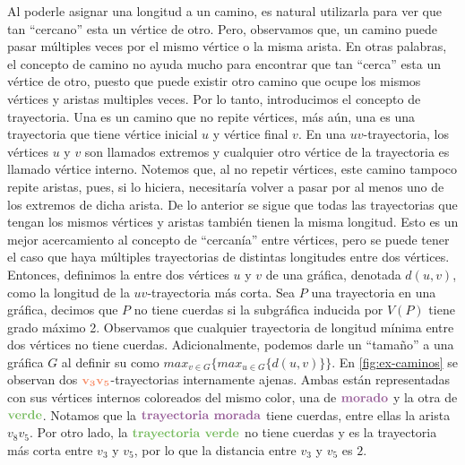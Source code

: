     Al poderle asignar una longitud a un camino, es natural utilizarla para ver
    que tan ``cercano'' esta un v\'ertice de otro. Pero, observamos que, un
    camino puede pasar m\'ultiples veces por el mismo v\'ertice o la misma
    arista. En otras palabras, el concepto de camino no ayuda mucho para
    encontrar que tan ``cerca'' esta un v\'ertice de otro, puesto que puede
    existir otro camino que ocupe los mismos v\'ertices y aristas multiples
    veces. Por lo tanto, introducimos el concepto de trayectoria. Una
     es un camino que no repite v\'ertices, m\'as a\'un, una
     es una trayectoria que tiene v\'ertice inicial $u$
    y v\'ertice final $v$. En una $uv$-trayectoria, los v\'ertices $u$ y $v$ son
    llamados extremos y cualquier otro v\'ertice de la trayectoria es llamado
    v\'ertice interno. Notemos que, al no repetir v\'ertices, este camino
    tampoco repite aristas, pues, si lo hiciera, necesitar\'ia volver a pasar
    por al menos uno de los extremos de dicha arista. De lo anterior se sigue
    que todas las trayectorias que tengan los mismos v\'ertices y aristas
    tambi\'en tienen la misma longitud. Esto es un mejor acercamiento al
    concepto de ``cercan\'ia'' entre v\'ertices, pero se puede tener el caso que
    haya m\'ultiples trayectorias de distintas longitudes entre dos v\'ertices.
    Entonces, definimos la  entre dos v\'ertices $u$ y $v$ de
    una gr\'afica, denotada $d(u,v)$, como la longitud de la $uv$-trayectoria
    m\'as corta. Sea $P$ una trayectoria en una gr\'afica, decimos que $P$ no
    tiene cuerdas si la subgr\'afica inducida por $V(P)$ tiene grado m\'aximo 2.
    Observamos que cualquier trayectoria de longitud m\'inima entre dos
    v\'ertices no tiene cuerdas. Adicionalmente, podemos darle un ``tama\~{n}o''
    a una gr\'afica $G$ al definir su  como $max_{v\in
    G}\{max_{u\in G}\{d(u,v)\}\}$. En \cref{fig:ex-caminos} se observan dos
    ${\color{coral}\bf v_3 v_5}$-trayectorias internamente ajenas. Ambas est\'an
    representadas con sus v\'ertices internos coloreados del mismo color, una de
    ${\color{morado}\bf morado}$ y la otra de ${\color{verde}\bf verde}$.
    Notamos que la ${\color{morado}\textbf{trayectoria morada}}$ tiene cuerdas,
    entre ellas la arista $v_8v_5$. Por otro lado, la
    ${\color{verde}\textbf{trayectoria verde}}$ no tiene cuerdas y es la
    trayectoria m\'as corta entre $v_3$ y $v_5$, por lo que la distancia entre
    $v_3$ y $v_5$ es $2$.

